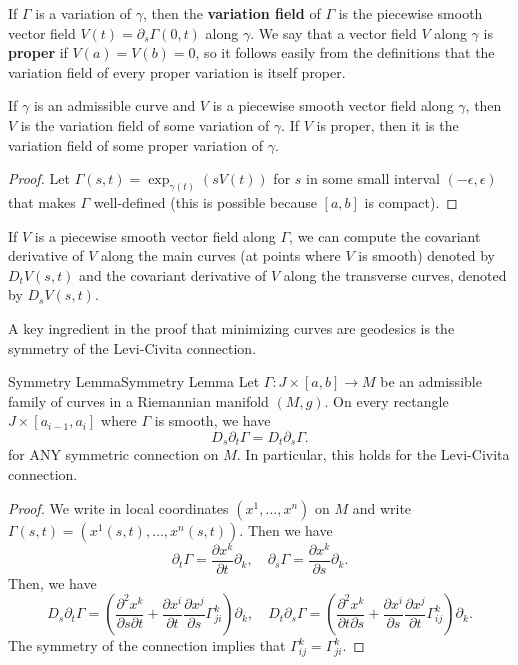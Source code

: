 \documentclass[../main.tex]{subfiles}
\begin{document}
If $\Gamma$ is a variation of $\gamma$, then the \textbf{variation field} of $\Gamma$ is the piecewise smooth vector field $V(t) = \partial_s \Gamma(0,t)$ along $\gamma$. We say that a vector field $V$ along $\gamma$ is \textbf{proper} if $V(a) = V(b) = 0$, so it follows easily from the definitions that the variation field of every proper variation is itself proper.

\begin{lemma}{}{}
  If $\gamma$ is an admissible curve and $V$ is a piecewise smooth vector field along $\gamma$, then $V$ is the variation field of some variation of $\gamma$. If $V$ is proper, then it is the variation field of some proper variation of $\gamma$.
\end{lemma}
\begin{proof}
  Let $\Gamma(s,t) = \exp_{\gamma(t)}(sV(t))$ for $s$ in some small interval $(-\epsilon, \epsilon)$ that makes $\Gamma$ well-defined (this is possible because $[a,b]$ is compact).
\end{proof}

If $V$ is a piecewise smooth vector field along $\Gamma$, we can compute the covariant derivative of $V$ along the main curves (at points where $V$ is smooth) denoted by $D_t V(s,t)$ and the covariant derivative of $V$ along the transverse curves, denoted by $D_s V(s,t)$.

A key ingredient in the proof that minimizing curves are geodesics is the symmetry of the Levi-Civita connection.

\begin{lemma}{Symmetry Lemma}{Symmetry Lemma}
  Let $\Gamma: J \times [a,b] \to M$ be an admissible family of curves in a Riemannian manifold $(M,g)$. On every rectangle $J \times [a_{i-1}, a_i]$ where $\Gamma$ is smooth, we have
  \begin{equation}
    D_s \partial_t \Gamma = D_t \partial_s \Gamma.
  \end{equation}
  for ANY symmetric connection on $M$. In particular, this holds for the Levi-Civita connection.
\end{lemma}
\begin{proof}
  We write in local coordinates $(x^1, \ldots, x^n)$ on $M$ and write $\Gamma(s,t) = (x^1(s,t), \ldots, x^n(s,t))$. Then we have
  \begin{equation*}
    \partial_t \Gamma = \frac{\partial x^k}{\partial t} \partial_k, \quad \partial_s \Gamma = \frac{\partial x^k}{\partial s} \partial_k.
  \end{equation*}
  Then, we have
  \begin{equation*}
    D_s \partial_t \Gamma = \left( \frac{\partial^2 x^k}{\partial s \partial t} + \frac{\partial x^i}{\partial t} \frac{\partial x^j}{\partial s} \Gamma_{ji}^k \right) \partial_k, \quad D_t \partial_s \Gamma = \left( \frac{\partial^2 x^k}{\partial t \partial s} + \frac{\partial x^i}{\partial s} \frac{\partial x^j}{\partial t} \Gamma_{ij}^k \right) \partial_k.
  \end{equation*}
  The symmetry of the connection implies that $\Gamma_{ij}^k = \Gamma_{ji}^k$.
\end{proof}
\end{document}
